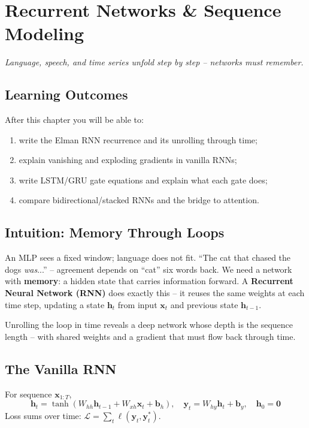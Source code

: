 \chapter{Recurrent Networks \& Sequence Modeling}\label{ch:rnn}
\begin{center}\small\textit{Language, speech, and time series unfold step by step -- networks must remember.}\end{center}

\noindent{}
\vspace{0.3em}
\section*{Learning Outcomes}
After this chapter you will be able to:
\begin{enumerate}[label=(L\arabic*)]
    \item write the Elman RNN recurrence and its unrolling through time;
    \item explain vanishing and exploding gradients in vanilla RNNs;
    \item write LSTM/GRU gate equations and explain what each gate does;
    \item compare bidirectional/stacked RNNs and the bridge to attention.
\end{enumerate}

\section{Intuition: Memory Through Loops}
An MLP sees a fixed window; language does not fit. ``The cat that chased the dogs \emph{was}...'' -- agreement depends on ``cat'' six words back. We need a network with \textbf{memory}: a hidden state that carries information forward. A \textbf{Recurrent Neural Network (RNN)} does exactly this -- it reuses the same weights at each time step, updating a state $\mathbf{h}_t$ from input $\mathbf{x}_t$ and previous state $\mathbf{h}_{t-1}$.

Unrolling the loop in time reveals a deep network whose depth is the sequence length -- with shared weights and a gradient that must flow back through time.

\section{The Vanilla RNN}
\begin{definition}
For sequence $\mathbf{x}_{1:T}$,
\begin{equation}
\mathbf{h}_t = \tanh(W_{hh}\mathbf{h}_{t-1}+W_{xh}\mathbf{x}_t+\mathbf{b}_h),\quad \mathbf{y}_t = W_{hy}\mathbf{h}_t+\mathbf{b}_y,\quad \mathbf{h}_0=\mathbf{0}
\end{equation}
Loss sums over time: $\mathcal{L}=\sum_t \ell(\mathbf{y}_t,\mathbf{y}^*_t)$.
\end{definition}

